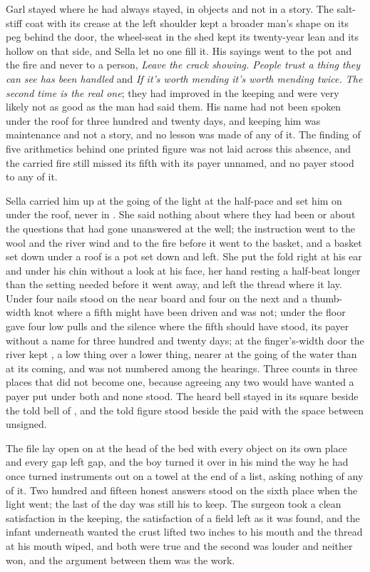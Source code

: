 Garl stayed where he had always stayed, in objects and not in a story. The salt-stiff coat with its crease at the left shoulder kept a broader man's shape on its peg behind the door, the wheel-seat in the shed kept its twenty-year lean and its hollow on that side, and Sella let no one fill it. His sayings went to the pot and the fire and never to a person, \emph{Leave the crack showing. People trust a thing they can see has been handled} and \emph{If it's worth mending it's worth mending twice. The second time is the real one}; they had improved in the keeping and were very likely not as good as the man had said them. His name had not been spoken under the roof for three hundred and twenty days, and keeping him was maintenance and not a story, and no lesson was made of any of it. The finding of five arithmetics behind one printed figure was not laid across this absence, and the carried fire still missed its fifth with its payer unnamed, and no payer stood to any of it.

\scenebreak

Sella carried him up at the going of the light at the half-pace and set him on  under the roof, never in . She said nothing about where they had been or about the questions that had gone unanswered at the well; the instruction went to the wool and the river wind and to the fire before it went to the basket, and a basket set down under a roof is a pot set down and left. She put the fold right at his ear and under his chin without a look at his face, her hand resting a half-beat longer than the setting needed before it went away, and left the thread where it lay. Under  four nails stood on the near board and four on the next and a thumb-width knot where a fifth might have been driven and was not; under the floor  gave four low pulls and the silence where the fifth should have stood, its payer without a name for three hundred and twenty days; at the finger's-width door the river kept , a low thing over a lower thing, nearer at the going of the water than at its coming, and was not numbered among the hearings. Three counts in three places that did not become one, because agreeing any two would have wanted a payer put under both and none stood. The heard bell stayed in its square beside the told bell of , and the told figure stood beside the paid with the space between unsigned.

The file lay open on  at the head of the bed with every object on its own place and every gap left gap, and the boy turned it over in his mind the way he had once turned instruments out on a towel at the end of a list, asking nothing of any of it. Two hundred and fifteen honest answers stood on the sixth place when the light went; the last of the day was still his to keep. The surgeon took a clean satisfaction in the keeping, the satisfaction of a field left as it was found, and the infant underneath wanted the crust lifted two inches to his mouth and the thread at his mouth wiped, and both were true and the second was louder and neither won, and the argument between them was the work.

